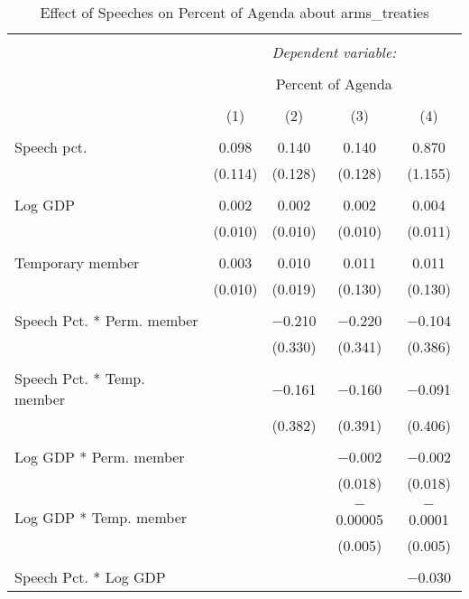 
\begin{table}[!htbp] \centering 
  \caption{Effect of Speeches on Percent of Agenda about  arms_treaties} 
  \label{} 
\begin{tabular}{@{\extracolsep{5pt}}lcccc} 
\\[-1.8ex]\hline 
\hline \\[-1.8ex] 
 & \multicolumn{4}{c}{\textit{Dependent variable:}} \\ 
\cline{2-5} 
\\[-1.8ex] & \multicolumn{4}{c}{Percent of Agenda} \\ 
\\[-1.8ex] & (1) & (2) & (3) & (4)\\ 
\hline \\[-1.8ex] 
 Speech pct. & 0.098 & 0.140 & 0.140 & 0.870 \\ 
  & (0.114) & (0.128) & (0.128) & (1.155) \\ 
  & & & & \\ 
 Log GDP & 0.002 & 0.002 & 0.002 & 0.004 \\ 
  & (0.010) & (0.010) & (0.010) & (0.011) \\ 
  & & & & \\ 
 Temporary member & 0.003 & 0.010 & 0.011 & 0.011 \\ 
  & (0.010) & (0.019) & (0.130) & (0.130) \\ 
  & & & & \\ 
 Speech Pct. * Perm. member &  & $-$0.210 & $-$0.220 & $-$0.104 \\ 
  &  & (0.330) & (0.341) & (0.386) \\ 
  & & & & \\ 
 Speech Pct. * Temp. member &  & $-$0.161 & $-$0.160 & $-$0.091 \\ 
  &  & (0.382) & (0.391) & (0.406) \\ 
  & & & & \\ 
 Log GDP * Perm. member &  &  & $-$0.002 & $-$0.002 \\ 
  &  &  & (0.018) & (0.018) \\ 
  & & & & \\ 
 Log GDP * Temp. member &  &  & $-$0.00005 & $-$0.0001 \\ 
  &  &  & (0.005) & (0.005) \\ 
  & & & & \\ 
 Speech Pct. * Log GDP &  &  &  & $-$0.030 \\ 

\end{tabular}
\end{table}

